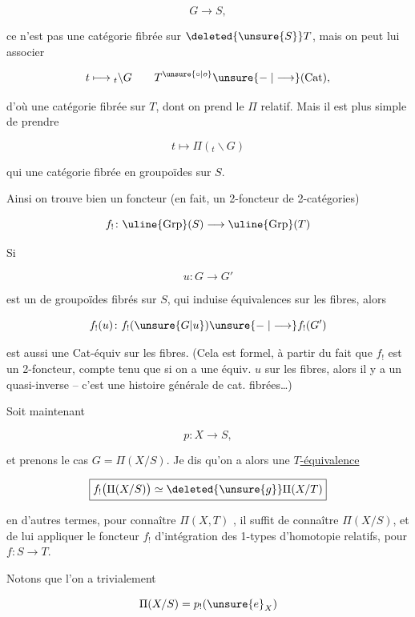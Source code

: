 \[
G\longrightarrow S,
\]

ce n'est pas une catégorie fibrée sur $\deleted{\unsure{S}}T$,  mais on peut lui associer

\[
t\longmapsto {}_{t}\backslash G\qquad T^{\unsure{\circ|o}}\unsure{\mathrel{-}|\longrightarrow}(\mathrm{Cat}),
\]

d'où une catégorie fibrée sur $T$, dont on prend le $\Pi$ relatif. Mais il est plus simple de prendre  

\[
t\longmapsto\Pi({}_{t}\backslash G)
\]

qui   une  catégorie fibrée en groupoïdes sur $S$.

Ainsi on trouve bien un foncteur (en fait,  un 2-foncteur de 2-catégories)

\[
f_!\colon\uline{\mathrm{Grp}}(S)\longrightarrow\uline{\mathrm{Grp}}(T)
\]

Si

\[
u\colon G\longrightarrow G'
\]

est un  de groupoïdes fibrés sur $S$, qui induise  équivalences sur les fibres, alors

\[
f_!(u)\colon f_!(\unsure{G|u})\unsure{\mathrel{-}|\longrightarrow}f_!(G')
\]

est aussi une Cat-équiv sur les fibres. (Cela est formel, à partir du fait que $f_!$ est un 2-foncteur, compte tenu que si on a une équiv. $u$ sur les fibres, alors il y a un quasi-inverse -- c'est une histoire générale de cat. fibrées\ldots)

Soit maintenant

\[
p\colon X\longrightarrow S,
\]

et prenons le cas $G=\Pi(X/S)$. Je dis qu'on a alors une \uline{$T$-équivalence} 

\[
\boxed{f_!\bigl(\Pi(X/S)\bigr)\simeq\deleted{\unsure{g}}\Pi(X/T)}
\]

en d'autres termes, pour connaître $\Pi(X,T)$ , il suffit de connaître $\Pi(X/S)$, et de lui appliquer le foncteur $f_!$ d'intégration des 1-types d'homotopie relatifs, pour $f\colon S\longrightarrow T$.

Notons que l'on a trivialement

\[
\Pi(X/S)=p_!(\unsure{e}_X)
\]

